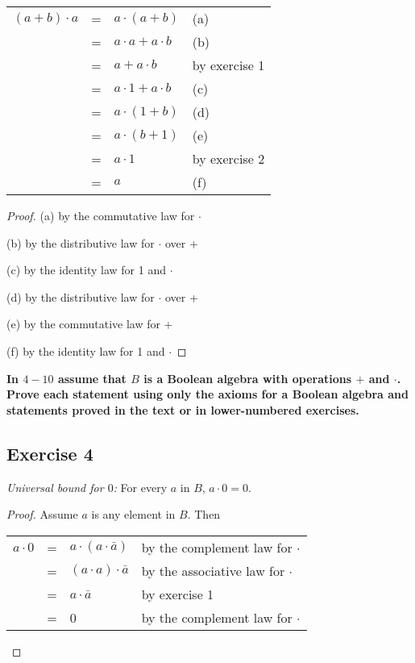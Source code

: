 \documentclass[14pt]{extarticle}
\newcommand{\fbl}{\underline{\hspace{1cm}}\,\,}
\newcommand{\cy}{\color{cyan}}
\begin{document}
\begin{center}
  \begin{tabular}{rcll}
    \((a+b) \cdot a\) & = & \(a \cdot (a+b)\)         & {\cy(a)\fbl}        \\
    \(\)              & = & \(a \cdot a + a \cdot b\) & {\cy (b) \fbl}      \\
    \(\)              & = & \(a + a \cdot b\)         & {\cy by exercise 1} \\
    \(\)              & = & \(a \cdot 1 + a \cdot b\) & {\cy (c) \fbl}      \\
    \(\)              & = & \(a \cdot(1 + b)\)        & {\cy (d) \fbl}      \\
    \(\)              & = & \(a \cdot(b + 1)\)        & {\cy (e) \fbl}      \\
    \(\)              & = & \(a \cdot 1\)             & {\cy by exercise 2} \\
    \(\)              & = & \(a\)                     & {\cy (f) \fbl}
  \end{tabular}
\end{center}

\begin{proof}
  {\cy (a)} by the commutative law for $\cdot$

  {\cy (b)} by the distributive law for $\cdot$ over +

  {\cy (c)} by the identity law for 1 and $\cdot$

  {\cy (d)} by the distributive law for $\cdot$ over +

  {\cy (e)} by the commutative law for +

  {\cy (f)} by the identity law for 1 and $\cdot$
\end{proof}

{\bf \cy In $4-10$ assume that $B$ is a Boolean algebra with operations $+$ and $\cdot$. Prove each statement using
only the axioms for a Boolean algebra and statements proved in the text or in lower-numbered exercises.}

\subsection{Exercise 4}
{\it Universal bound for $0$:} For every $a$ in $B$, \(a \cdot 0 = 0\).

\begin{proof}
  Assume $a$ is any element in $B$. Then
  \begin{center}
    \begin{tabular}{rcll}
      \(a \cdot 0\) & = & \(a \cdot (a \cdot \bar{a})\) & {\cy by the complement law for $\cdot$}  \\
                    & = & \((a \cdot a) \cdot \bar{a}\) & {\cy by the associative law for $\cdot$} \\
                    & = & \(a \cdot \bar{a}\)           & {\cy by exercise 1}                      \\
                    & = & 0                             & {\cy by the complement law for $\cdot$}  \\
    \end{tabular}
  \end{center}
\end{proof}
\end{document}
